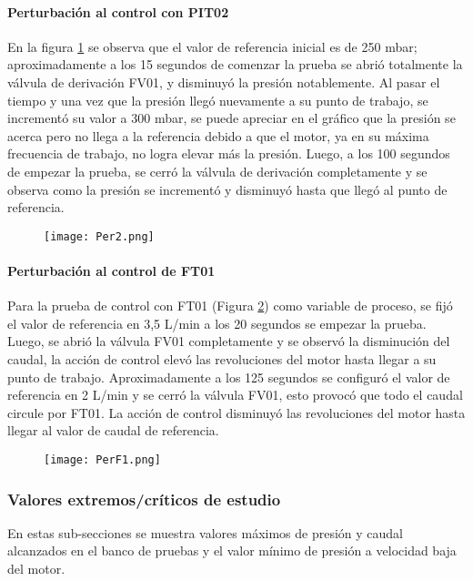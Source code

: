 {\clearpage
\paragraph{Perturbación al control con PIT02}
En la figura \ref{fig:per2} se observa que el valor de referencia inicial es de 250 mbar; aproximadamente a los 15 segundos de comenzar la prueba se abrió totalmente la válvula de derivación FV01, y disminuyó la presión notablemente. Al pasar el tiempo y una vez que la presión llegó nuevamente a su punto de trabajo, se incrementó su valor a 300 mbar, se puede apreciar en el gráfico que la presión se acerca pero no llega a la referencia debido a que el motor, ya en su máxima frecuencia de trabajo, no logra elevar más la presión. Luego, a los 100 segundos de empezar la prueba, se cerró la válvula de derivación completamente y se observa como la presión se incrementó y disminuyó hasta que llegó al punto de referencia.
\begin{figure}[h!]
	\centering
	\texttt{[image: Per2.png]}
	\label{fig:per2}
\end{figure}
\clearpage
\paragraph{Perturbación al control de FT01}
Para la prueba de control con FT01 (Figura \ref{fig:per1}) como variable de proceso, se fijó el valor de referencia en 3,5 L/min a los 20 segundos se empezar la prueba. Luego, se abrió la válvula FV01 completamente y se observó la disminución del caudal, la acción de control elevó las revoluciones del motor hasta llegar a su punto de trabajo. Aproximadamente a los 125 segundos se configuró el valor de referencia en 2 L/min y se cerró la válvula FV01, esto provocó que todo el caudal circule por FT01. La acción de control disminuyó las revoluciones del motor hasta llegar al valor de caudal de referencia.

\begin{figure}[h!]
	\centering
	\texttt{[image: PerF1.png]}
	\label{fig:per1}
\end{figure}

\clearpage
\subsubsection{Valores extremos/críticos de estudio}
En estas sub-secciones se muestra valores máximos de presión y caudal alcanzados en el banco de pruebas y el valor mínimo de presión a velocidad baja del motor.

}
